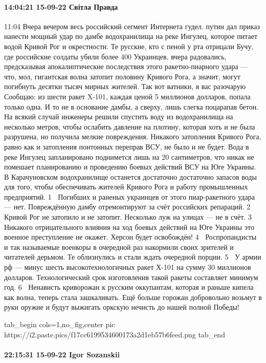 \paragraph{14:04:21 15-09-22 Світла Правда}
11:04
Вчера вечером весь российский сегмент Интернета гудел. путин дал приказ нанести мощный удар по дамбе водохранилища на реке Ингулец, которое питает водой Кривой Рог и окрестности.
Те русские, кто с пеной у рта отрицали Бучу, где российские солдаты убили более 400 Украинцев, вчера радовались, предсказывая апокалиптические последствия этого ракетно-пиарного удара — что, мол, гигантская волна затопит половину Кривого Рога, а значит, могут погибнуть десятки тысяч мирных жителей.
Так вот ватники, я вас разочарую
Сообщаю: из шести ракет X-101, каждая ценой 5 миллионов долларов, попала только одна.
И то не в основание дамбы, а сверху, лишь слегка поцарапав бетон.
На всякий случай инженеры решили спустить воду из водохранилища на несколько метров, чтобы ослабить давление на плотину, которая хоть и не была разрушена, но получила мелкие повреждения.
Никакого затопления Кривого Рога, равно как и затопления понтонных переправ ВСУ, не было и не будет.
Вода в реке Ингулец запланировано поднимется лишь на 20 сантиметров, что никак не помешает планированию и проведению боевых действий ВСУ на Юге Украины.
В Карачуновском водохранилище останется достаточно достаточно запасов воды для того, чтобы обеспечивать жителей Кривого Рога и работу промышленных предприятий.
1⃣⃣ Погибших и раненых украинцев от этого пиар-ракетного удара — нет. Повреждённую дамбу отремонтируют за счёт российских репараций.
2⃣⃣ Кривой Рог не затопило и не затопит. Несколько луж на улицах — не в счёт.
3⃣⃣ Никакого отрицательного влияния на ход боевых действий на Юге Украины это военное преступление не окажет. Херсон будет освобождён!
4⃣⃣ Роспропандисты и так называемые военкоры в очередной раз накормили своих зрителей и читателей дерьмом. Те облизнулись и стали ждать очередной порции.
5⃣⃣ У армии рф — минус шесть высокотехнологичных ракет Х-101 на сумму 30 миллионов долларов. Технологический срок изготовления такой ракеты составляет минимум год.
6⃣⃣ Ненависть криворожан к русским оккупантам, которая и раньше кипела как волна, теперь стала зашкаливать. Ещё больше горожан добровольно возьмут в руки оружие и будут выжигать оркскую нечисть до нашей полной Победы!

\ifcmt
  tab_begin cols=1,no_fig,center
     pic https://i2.paste.pics/f17cc6199534600173a2d1eb57b6feed.png
  tab_end
\fi

\paragraph{22:15:31 15-09-22 Igor Sozanskii}

